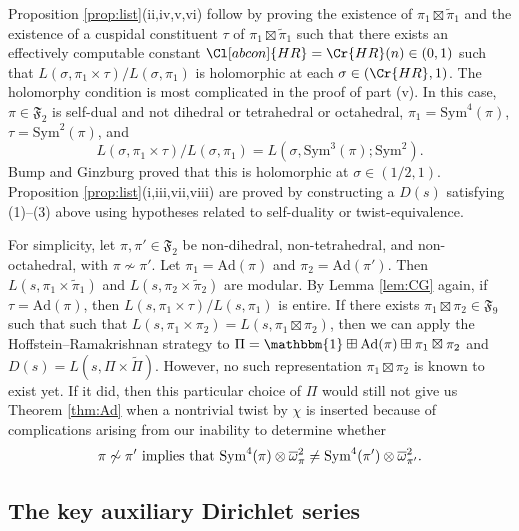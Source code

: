 \documentclass[11pt]{amsart}
\theoremstyle{remark}
\numberwithin{equation}{section}
\begin{document}
Proposition \ref{prop:list}(ii,iv,v,vi) follow by proving the existence of $\pi_1\boxtimes\widetilde{\pi}_1$ and the existence of a cuspidal constituent $\tau$ of $\pi_1\boxtimes\widetilde{\pi}_1$ such that there exists an effectively computable constant $\Cl[abcon]{HR}=\Cr{HR}(n)\in(0,1)$ such that $L(\sigma,\pi_1\times\tau)/L(\sigma,\pi_1)$ is holomorphic at each $\sigma\in(\Cr{HR},1)$.  The holomorphy condition is most complicated in the proof of part (v).  In this case, $\pi\in \mathfrak{F}_{2}$ is self-dual and not dihedral or tetrahedral or octahedral, $\pi_1=\mathrm{Sym}^4(\pi)$, $\tau=\mathrm{Sym}^2(\pi)$, and
\[
L(\sigma,\pi_1\times\tau)/L(\sigma,\pi_1)=L(\sigma,\mathrm{Sym}^3(\pi);\mathrm{Sym}^2).
\]
Bump and Ginzburg \cite{BumpGinzburg} proved that this is holomorphic at $\sigma\in(1/2,1)$. Proposition \ref{prop:list}(i,iii,vii,viii) are proved by constructing a $D(s)$ satisfying (1)--(3) above using hypotheses related to self-duality or twist-equivalence.

For simplicity, let $\pi,\pi'\in\mathfrak{F}_2$ be non-dihedral, non-tetrahedral, and non-octahedral, with $\pi\not\sim\pi'$.  Let $\pi_1=\mathrm{Ad}(\pi)$ and $\pi_2=\mathrm{Ad}(\pi')$.  Then $L(s,\pi_1\times\widetilde{\pi}_1)$ and $L(s,\pi_2\times\widetilde{\pi}_2)$ are modular.  By Lemma \ref{lem:CG} again, if $\tau=\mathrm{Ad}(\pi)$, then $L(s,\pi_1\times\tau)/L(s,\pi_1)$ is entire.  If there exists $\pi_1\boxtimes\pi_2\in\mathfrak{F}_{9}$ such that such that $L(s,\pi_1\times\pi_2)=L(s,\pi_1\boxtimes\pi_2)$, then we can apply the Hoffstein--Ramakrishnan strategy to $\Pi = \mathbbm{1}\boxplus \mathrm{Ad}(\pi)\boxplus \pi_1\boxtimes\pi_2$ and $D(s)=L(s,\Pi\times\widetilde{\Pi})$.  However, no such representation $\pi_1\boxtimes\pi_2$ is known to exist yet.  If it did, then this particular choice of $\Pi$ would still not give us Theorem \ref{thm:Ad} when a nontrivial twist by $\chi$ is inserted because of complications arising from our inability to determine whether
\begin{equation}
\label{eqn:pole_question}
\textup{$\pi\not\sim\pi'$ implies that $\mathrm{Sym}^4(\pi)\otimes\overline{\omega}_{\pi}^2\neq \mathrm{Sym}^4(\pi')\otimes\overline{\omega}_{\pi'}^2$.}
\end{equation}

\subsection{The key auxiliary Dirichlet series}
\end{document}
